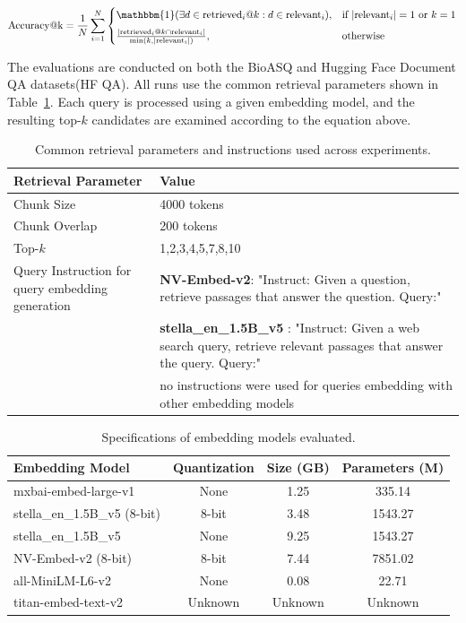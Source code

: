 \documentclass[pdflatex,sn-mathphys-num]{sn-jnl}%
\theoremstyle{thmstyleone}%
\theoremstyle{thmstyletwo}%
\theoremstyle{thmstylethree}%
\begin{document}
\begin{equation}
\text{Accuracy@k} = \frac{1}{N} \sum_{i=1}^{N} 
    \begin{cases}
      \mathbbm{1}(\exists d \in \text{retrieved}_i@k : d \in \text{relevant}_i), & \text{if } |\text{relevant}_i| = 1 \text{ or } k = 1 \\[6pt]
      \frac{|\text{retrieved}_i@k \cap \text{relevant}_i|}{\min(k, |\text{relevant}_i|)}, & \text{otherwise}
    \end{cases}
\end{equation}

The evaluations are conducted on both the BioASQ and Hugging Face Document QA datasets(HF QA). All runs use the common retrieval parameters shown in Table~\ref{table:retrieval_params}. Each query is processed using a given embedding model, and the resulting top-$k$ candidates are examined according to the equation above.

\begin{table}[h]
\centering
\begin{tabular}{|p{4cm}|p{8cm}|}
\hline
\textbf{Retrieval Parameter} & \textbf{Value} \\
\hline
Chunk Size & 4000 tokens \\
Chunk Overlap & 200 tokens \\
Top-$k$ & 1,2,3,4,5,7,8,10 \\
Query Instruction for query embedding generation & \textbf{NV-Embed-v2}: "Instruct: Given a question, retrieve passages that answer the question. Query:" \\ 
~ & \textbf{stella\_en\_1.5B\_v5 }: "Instruct: Given a web search query, retrieve relevant passages that answer the query. Query:" \\
~ & no instructions were used for queries embedding with  other embedding models\\
\hline
\end{tabular}
\caption{Common retrieval parameters and instructions used across experiments.}
\label{table:retrieval_params}
\end{table}


\begin{table}[h]
\centering
\begin{tabular}{|l|c|c|c|}
\hline
\textbf{Embedding Model} & \textbf{Quantization} & \textbf{Size (GB)} & \textbf{Parameters (M)} \\ \hline
mxbai-embed-large-v1      & None   & 1.25 & 335.14 \\ \hline
stella\_en\_1.5B\_v5 (8-bit) & 8-bit & 3.48 & 1543.27 \\ \hline
stella\_en\_1.5B\_v5         & None  & 9.25 & 1543.27 \\ \hline
NV-Embed-v2 (8-bit)       & 8-bit & 7.44 & 7851.02 \\ \hline
all-MiniLM-L6-v2          & None  & 0.08 & 22.71 \\ \hline
titan-embed-text-v2       & Unknown & Unknown & Unknown \\ \hline
\end{tabular}
\caption{Specifications of embedding models evaluated.}
\label{table:model_specs}
\end{table}
\end{document}
